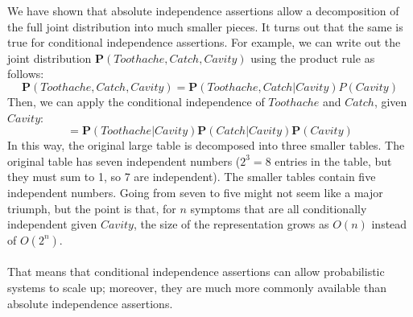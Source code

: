 We have shown that absolute independence assertions allow a decomposition of the full joint distribution into much smaller pieces. It turns out that the same is true for conditional independence assertions. For example, we can write out the joint distribution $\textbf{P}(Toothache, Catch, Cavity)$ using the product rule as follows:
\[\textbf{P}(Toothache, Catch, Cavity) = \textbf{P}(Toothache, Catch | Cavity)P(Cavity) \]
Then, we can apply the conditional independence of $Toothache$ and $Catch$, given $Cavity$:
\[= \textbf{P}(Toothache | Cavity)\textbf{P}(Catch | Cavity)\textbf{P}(Cavity)\]
In this way, the original large table is decomposed into three smaller tables. The original table has seven independent numbers ($2^3 = 8$ entries in the table, but they must sum to 1, so 7 are independent). The smaller tables contain five independent numbers. Going from seven to five might not seem like a major triumph, but the point is that, for $n$ symptoms that are all conditionally independent given $Cavity$, the size of the representation grows as $O(n)$ instead of $O(2^n)$.\\\\
That means that conditional independence assertions can allow probabilistic systems to scale up; moreover, they are much more commonly available than absolute independence assertions.


